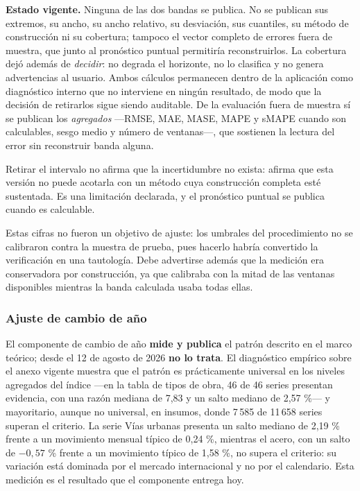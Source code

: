 \documentclass[12pt,letterpaper]{article}
\begin{document}
\textbf{Estado vigente.} Ninguna de las dos bandas se publica. No se publican sus extremos, su ancho, su ancho relativo, su desviación, sus cuantiles, su método de construcción ni su cobertura; tampoco el vector completo de errores fuera de muestra, que junto al pronóstico puntual permitiría reconstruirlos. La cobertura dejó además de \emph{decidir}: no degrada el horizonte, no lo clasifica y no genera advertencias al usuario. Ambos cálculos permanecen dentro de la aplicación como diagnóstico interno que no interviene en ningún resultado, de modo que la decisión de retirarlos sigue siendo auditable. De la evaluación fuera de muestra sí se publican los \emph{agregados} ---RMSE, MAE, MASE, MAPE y sMAPE cuando son calculables, sesgo medio y número de ventanas---, que sostienen la lectura del error sin reconstruir banda alguna.

Retirar el intervalo no afirma que la incertidumbre no exista: afirma que esta versión no puede acotarla con un método cuya construcción completa esté sustentada. Es una limitación declarada, y el pronóstico puntual se publica cuando es calculable.

Estas cifras no fueron un objetivo de ajuste: los umbrales del procedimiento no se calibraron contra la muestra de prueba, pues hacerlo habría convertido la verificación en una tautología. Debe advertirse además que la medición era conservadora por construcción, ya que calibraba con la mitad de las ventanas disponibles mientras la banda calculada usaba todas ellas.

\subsubsection{Ajuste de cambio de año}

El componente de cambio de año \textbf{mide y publica} el patrón descrito en el marco teórico; desde el 12 de agosto de 2026 \textbf{no lo trata}. El diagnóstico empírico sobre el anexo vigente muestra que el patrón es prácticamente universal en los niveles agregados del índice ---en la tabla de tipos de obra, 46 de 46 series presentan evidencia, con una razón mediana de 7,83 y un salto mediano de 2,57 \%--- y mayoritario, aunque no universal, en insumos, donde 7\,585 de 11\,658 series superan el criterio. La serie Vías urbanas presenta un salto mediano de 2,19 \% frente a un movimiento mensual típico de 0,24 \%, mientras el acero, con un salto de \(-0{,}57\) \% frente a un movimiento típico de 1,58 \%, no supera el criterio: su variación está dominada por el mercado internacional y no por el calendario. Esta medición es el resultado que el componente entrega hoy.
\end{document}
